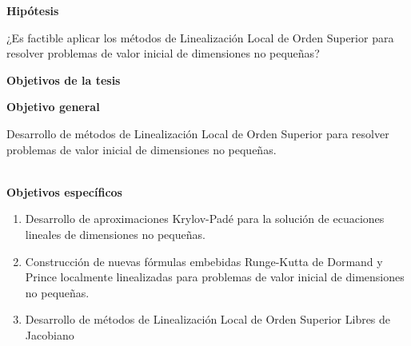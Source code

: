 \newpage

\begin{center}
	{\large \textbf{Hipótesis}}
\end{center}
¿Es factible aplicar los métodos de Linealización Local de Orden Superior para resolver problemas de valor inicial de dimensiones no pequeñas?

\qquad

\begin{center}
	{\large \textbf{Objetivos de la tesis}}
\end{center}
\textbf{Objetivo general}

Desarrollo de métodos de Linealización Local de Orden Superior para resolver problemas de valor inicial de dimensiones no pequeñas.

\qquad\\
\textbf{Objetivos específicos}

\begin{enumerate}
	\item Desarrollo de aproximaciones Krylov-Padé para la solución de ecuaciones lineales de dimensiones no pequeñas.
	\item Construcción de nuevas fórmulas embebidas Runge-Kutta de Dormand y Prince localmente linealizadas para problemas de valor inicial de dimensiones no pequeñas.
	\item Desarrollo de métodos de Linealización Local de Orden Superior Libres de Jacobiano
\end{enumerate}
